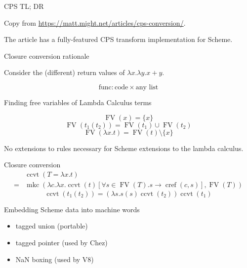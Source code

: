 \documentclass{beamer}
\begin{document}
\begin{frame}{CPS TL; DR}
  \begin{center}
    Copy from \url{https://matt.might.net/articles/cps-conversion/}.
  \end{center}
  The article has a fully-featured CPS transform implementation for Scheme.
\end{frame}

\begin{frame}{Closure conversion rationale}
  \begin{example}
    Consider the (different) return values of $\lambda x.\lambda y.x+y$.
  \end{example}

    \[\text{func}: \text{code}\times\text{any list}\]
\end{frame}

\newcommand{\FV}{\operatorname{FV}}
\begin{frame}{Finding free variables of Lambda Calculus terms}
  \begin{theorem}
    \[\FV(x)=\{x\}\]
    \[\FV(t_1(t_2))=\FV(t_1)\cup\FV(t_2)\]
    \[\FV(\lambda x.t)=\FV(t)\setminus\{x\}\]
  \end{theorem}

  No extensions to rules necessary for Scheme extensions to the lambda calculus.
\end{frame}

\newcommand{\cloConv}{\operatorname{ccvt}}
\newcommand{\makeClosure}{\operatorname{mkc}}
\begin{frame}{Closure conversion}
  \[
    \begin{aligned}
      &\cloConv(T=\lambda x.t)\\
      =&\makeClosure(\lambda c.\lambda x.\cloConv(t)[\forall s\in\FV(T).s\to\operatorname{cref}(c, s)], \FV(T))
    \end{aligned}
  \]
  \[
    \cloConv(t_1(t_2))=(\lambda s. s (s) \cloConv(t_2))\cloConv(t_1)
  \]
\end{frame}

\begin{frame}{Embedding Scheme data into machine words}
  \begin{itemize}
  \item tagged union (portable)
  \item tagged pointer (used by Chez)
  \item NaN boxing (used by V8)
  \end{itemize}
\end{frame}
\end{document}
